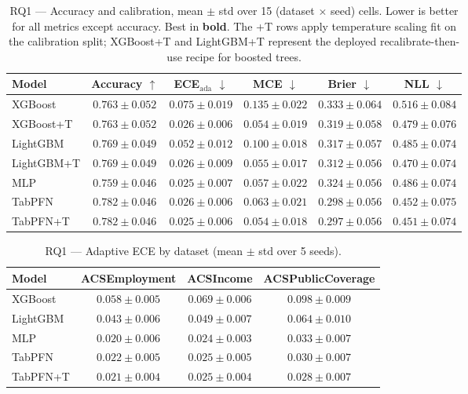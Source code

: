 \documentclass[review,12pt]{elsarticle}
\begin{document}
\begin{table}[t]
\centering
\caption{RQ1 --- Accuracy and calibration, mean $\pm$ std over 15 (dataset $\times$ seed) cells. Lower is better for all metrics except accuracy. Best in \textbf{bold}. The +T rows apply temperature scaling fit on the calibration split; XGBoost+T and LightGBM+T represent the deployed recalibrate-then-use recipe for boosted trees.}
\label{tab:rq1}
\small
\begin{tabular}{lccccc}
\toprule
Model & Accuracy $\uparrow$ & ECE$_{\mathrm{ada}}$ $\downarrow$ & MCE $\downarrow$ & Brier $\downarrow$ & NLL $\downarrow$ \\
\midrule
XGBoost      & $0.763 \pm 0.052$ & $0.075 \pm 0.019$ & $0.135 \pm 0.022$ & $0.333 \pm 0.064$ & $0.516 \pm 0.084$ \\
XGBoost+T    & $0.763 \pm 0.052$ & $0.026 \pm 0.006$ & $0.054 \pm 0.019$ & $0.319 \pm 0.058$ & $0.479 \pm 0.076$ \\
LightGBM     & $0.769 \pm 0.049$ & $0.052 \pm 0.012$ & $0.100 \pm 0.018$ & $0.317 \pm 0.057$ & $0.485 \pm 0.074$ \\
LightGBM+T   & $0.769 \pm 0.049$ & $0.026 \pm 0.009$ & $0.055 \pm 0.017$ & $0.312 \pm 0.056$ & $0.470 \pm 0.074$ \\
MLP          & $0.759 \pm 0.046$ & $0.025 \pm 0.007$ & $0.057 \pm 0.022$ & $0.324 \pm 0.056$ & $0.486 \pm 0.074$ \\
TabPFN       & $\mathbf{0.782 \pm 0.046}$ & $0.026 \pm 0.006$ & $0.063 \pm 0.021$ & $0.298 \pm 0.056$ & $0.452 \pm 0.075$ \\
TabPFN+T     & $\mathbf{0.782 \pm 0.046}$ & $\mathbf{0.025 \pm 0.006}$ & $\mathbf{0.054 \pm 0.018}$ & $\mathbf{0.297 \pm 0.056}$ & $\mathbf{0.451 \pm 0.074}$ \\
\bottomrule
\end{tabular}
\end{table}

\begin{table}[t]
\centering
\caption{RQ1 --- Adaptive ECE by dataset (mean $\pm$ std over 5 seeds).}
\label{tab:rq1ds}
\small
\begin{tabular}{lccc}
\toprule
Model & ACSEmployment & ACSIncome & ACSPublicCoverage \\
\midrule
XGBoost   & $0.058 \pm 0.005$ & $0.069 \pm 0.006$ & $0.098 \pm 0.009$ \\
LightGBM  & $0.043 \pm 0.006$ & $0.049 \pm 0.007$ & $0.064 \pm 0.010$ \\
MLP       & $\mathbf{0.020 \pm 0.006}$ & $\mathbf{0.024 \pm 0.003}$ & $0.033 \pm 0.007$ \\
TabPFN    & $0.022 \pm 0.005$ & $0.025 \pm 0.005$ & $0.030 \pm 0.007$ \\
TabPFN+T  & $0.021 \pm 0.004$ & $0.025 \pm 0.004$ & $\mathbf{0.028 \pm 0.007}$ \\
\bottomrule
\end{tabular}
\end{table}
\end{document}
